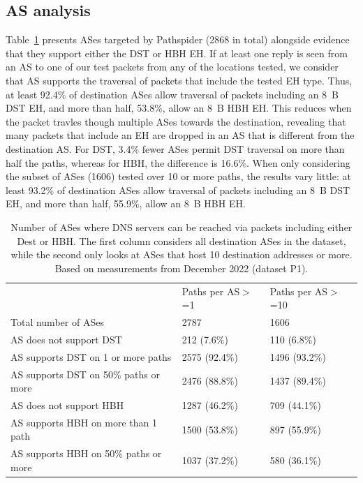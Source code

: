 \documentclass[conference]{IEEEtran}
\begin{document}
\subsection{AS analysis}

Table~\ref{tbl:as_pathspider} presents ASes targeted by Pathspider (2868 in total) alongside evidence that they support either the DST or HBH EH.
If at least one reply is seen from an AS to one of our test packets from any of the locations tested, we consider that AS supports the traversal of packets that include the tested EH type. Thus, at least 92.4\% of destination ASes allow traversal of packets including an 8~B DST EH, and more than half, 53.8\%, allow an 8~B HBH EH. This  reduces when the packet travles though multiple ASes towards the destination, revealing that many packets that include an EH are dropped in an AS that is different from the destination AS. For DST, 3.4\% fewer ASes permit DST traversal on more than half the paths, whereas for HBH, the difference is 16.6\%.
When only considering the subset of ASes (1606) tested over 10 or more paths, the results vary little: at least 93.2\% of destination ASes allow traversal of packets including an 8~B DST EH, and more than half, 55.9\%, allow an 8~B HBH EH.

    \begin{table}
\begin{tabular}{p{}|p{}p{}}
                                          & Paths per AS$>$=1 & Paths per AS$>$=10 \\ \cline{1-3} 
Total number of ASes                      & 2787                                            & 1606                                            \\ \hline
AS does not support DST               & 212 (7.6\%)                                     & 110 (6.8\%)                                     \\
AS supports DST on 1 or more paths   & 2575 (92.4\%)                                   & 1496 (93.2\%)                                   \\
AS supports DST on 50\% paths or more & 2476  (88.8\%)                                  & 1437 (89.4\%)                                   \\ \hline
AS does not support HBH               & 1287 (46.2\%)                                   & 709 (44.1\%)                                    \\
AS supports HBH on more than 1 path   & 1500 (53.8\%)                                   & 897 (55.9\%)                                    \\
AS supports HBH on 50\% paths or more & 1037 (37.2\%)                                   & 580 (36.1\%)                                   
\end{tabular}
\label{tbl:as_pathspider}
\caption{Number of ASes where DNS servers can be reached via packets including either Dest or HBH. The first column considers all destination ASes in the dataset, while the second only looks at ASes that host 10 destination addresses or more. Based on measurements from December 2022 (dataset P1).}
\end{table}
\end{document}
